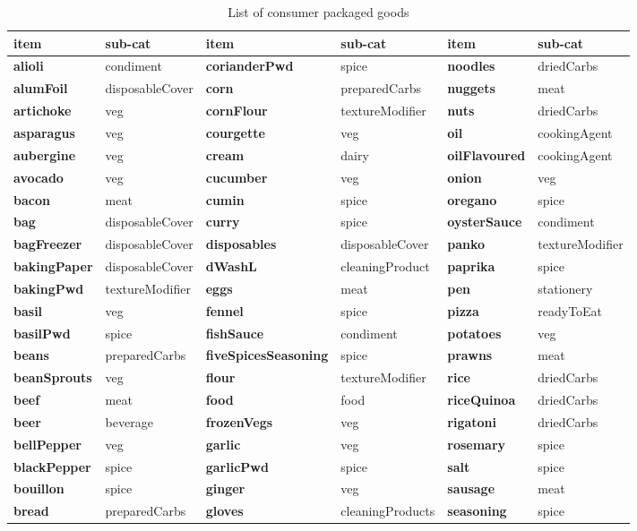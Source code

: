 \documentclass[]{article}
\begin{document}
\begin{table}

\caption{\label{tab:unnamed-chunk-6}List of consumer packaged goods}
\centering
\begin{tabular}[t]{>{\bfseries}l|l|>{\bfseries}l|l|>{\bfseries}l|l}
\hline
item & sub-cat & item & sub-cat & item & sub-cat\\
\hline
alioli & condiment & corianderPwd & spice & noodles & driedCarbs\\
\hline
alumFoil & disposableCover & corn & preparedCarbs & nuggets & meat\\
\hline
artichoke & veg & cornFlour & textureModifier & nuts & driedCarbs\\
\hline
asparagus & veg & courgette & veg & oil & cookingAgent\\
\hline
aubergine & veg & cream & dairy & oilFlavoured & cookingAgent\\
\hline
avocado & veg & cucumber & veg & onion & veg\\
\hline
bacon & meat & cumin & spice & oregano & spice\\
\hline
bag & disposableCover & curry & spice & oysterSauce & condiment\\
\hline
bagFreezer & disposableCover & disposables & disposableCover & panko & textureModifier\\
\hline
bakingPaper & disposableCover & dWashL & cleaningProduct & paprika & spice\\
\hline
bakingPwd & textureModifier & eggs & meat & pen & stationery\\
\hline
basil & veg & fennel & spice & pizza & readyToEat\\
\hline
basilPwd & spice & fishSauce & condiment & potatoes & veg\\
\hline
beans & preparedCarbs & fiveSpicesSeasoning & spice & prawns & meat\\
\hline
beanSprouts & veg & flour & textureModifier & rice & driedCarbs\\
\hline
beef & meat & food & food & riceQuinoa & driedCarbs\\
\hline
beer & beverage & frozenVegs & veg & rigatoni & driedCarbs\\
\hline
bellPepper & veg & garlic & veg & rosemary & spice\\
\hline
blackPepper & spice & garlicPwd & spice & salt & spice\\
\hline
bouillon & spice & ginger & veg & sausage & meat\\
\hline
bread & preparedCarbs & gloves & cleaningProducts & seasoning & spice\\

\end{tabular}
\end{table}
\end{document}
